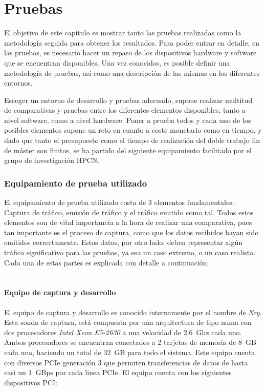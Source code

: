 \chapter{Pruebas\label{sec:desarrollo}}

El objetivo de este capítulo es mostrar tanto las pruebas realizadas como la metodología seguida para obtener los resultados.
Para poder entrar en detalle, en las pruebas, es necesario hacer un repaso de los dispositivos hardware y software que se encuentran disponibles. Una vez conocidos, es posible definir una metodología de pruebas, así como una descripción de las mismas en los diferentes entornos.


Escoger un entorno de desarrollo y pruebas adecuado, supone realizar multitud de comparativas y pruebas entre los diferentes elementos disponibles, tanto a nivel software, como a nivel hardware.
Poner a prueba todos y cada uno de los posibles elementos supone un reto en cuanto a coste monetario como en tiempo, y dado que tanto el presupuesto como el tiempo de realización del doble trabajo fin de máster son finitos, se ha partido del siguiente equipamiento facilitado por el grupo de investigación HPCN.

\subsection{Equipamiento de prueba utilizado\label{sec:equipamiento}}

El equipamiento de prueba utilizado costa de 3 elementos fundamentales: Captura de tráfico, emisión de tráfico y el tráfico emitido como tal.
Todos estos elementos son de vital importancia a la hora de realizar una comparativa, pues tan importante es el proceso de captura, como que los datos recibidos hayan sido emitidos correctamente. Estos datos, por otro lado, deben representar algún tráfico significativo para las pruebas, ya sea un caso extremo, o un caso realista. Cada una de estas partes es explicada con detalle a continuación:
\\
\\

\subsubsection{Equipo de captura y desarrollo}

El equipo de captura y desarrollo es conocido internamente por el nombre de \textit{Nrg}.
Esta sonda de captura, está compuesta por una arquitectura de tipo \gls{numa} con dos procesadores \textit{Intel Xeon E5-2630} a una velocidad de 2.6~Ghz cada uno.
Ambos procesadores se encuentran conectados a 2 tarjetas de memoria de 8~GB cada una, haciendo un total de 32~GB para todo el sistema.
Este equipo cuenta con diversos PCIe generación 3 que permiten transferencias de datos de hasta casi un 1~GBps por cada linea PCIe. El equipo cuenta con los siguientes dispositivos PCI:

